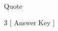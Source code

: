 \documentclass{exam}
\newcommand{\showallanswers}{\par\unvbox\allanswers}
\begin{document}
 \vspace{2.5cm}

\begin{center}
Quote
\end{center}

\pagebreak
\bigskip

\begin{multicols}{3}
[
Answer Key
]
\showallanswers %
\end{multicols}
\end{document}
